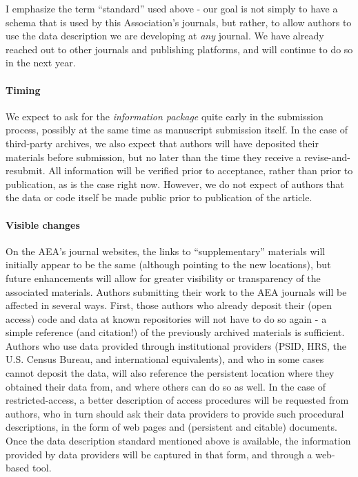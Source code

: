 \documentclass[PP]{AEA}
\begin{document}
I emphasize the term ``standard'' used above - our goal is not simply to have a schema that is used by this Association's journals, but rather, to allow authors to use the data description we are developing at \textit{any} journal. We have already reached out to other journals and publishing platforms, and will continue to do so in the next year. 

\paragraph{Timing}
We expect to ask for the \textit{information package} quite early in the submission process, possibly at the same time as manuscript submission itself. In the case of third-party archives, we also expect that authors will have deposited their materials before submission, but no later than the time they receive a revise-and-resubmit. All information will be verified prior to acceptance, rather than prior to publication, as is the case right now. However, we do not expect of authors that the data or code itself be made public prior to publication of the article. 


\paragraph{Visible changes} 
On the AEA's journal websites, the links to ``supplementary'' materials will initially appear to be the same (although pointing to the new locations), but future enhancements will allow for greater visibility or transparency of the associated materials. 
%
Authors submitting their work to the AEA journals will be affected in several ways. First, those authors who already deposit their (open access) code and data at known repositories will not have to do so again - a simple reference (and citation!) of the previously archived materials is sufficient. Authors who use data provided through institutional providers (\ac{PSID}, \ac{HRS}, the U.S. Census Bureau, and international equivalents), and who in some cases cannot deposit the data, will also reference the persistent location where they obtained their data from, and where others can do so as well. In the case of restricted-access, a better description of access procedures will be requested from authors, who in turn should ask their data providers to provide such procedural descriptions, in the form of web pages and (persistent and citable) documents. Once the data description standard mentioned above is available, the information provided by data providers will be captured in that form, and through a web-based tool. 
\end{document}

